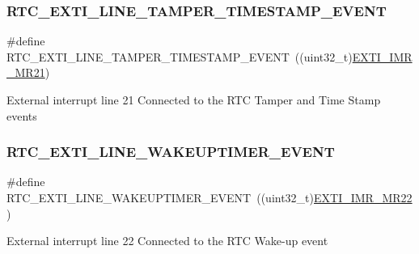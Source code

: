\subsubsection{\texorpdfstring{R\+T\+C\+\_\+\+E\+X\+T\+I\+\_\+\+L\+I\+N\+E\+\_\+\+T\+A\+M\+P\+E\+R\+\_\+\+T\+I\+M\+E\+S\+T\+A\+M\+P\+\_\+\+E\+V\+E\+NT}{RTC\_EXTI\_LINE\_TAMPER\_TIMESTAMP\_EVENT}}
{\footnotesize\ttfamily \#define R\+T\+C\+\_\+\+E\+X\+T\+I\+\_\+\+L\+I\+N\+E\+\_\+\+T\+A\+M\+P\+E\+R\+\_\+\+T\+I\+M\+E\+S\+T\+A\+M\+P\+\_\+\+E\+V\+E\+NT~((uint32\+\_\+t)\hyperlink{group___peripheral___registers___bits___definition_ga3cc7e64c45d273ca7396ac1e0ce38c36}{E\+X\+T\+I\+\_\+\+I\+M\+R\+\_\+\+M\+R21})}

External interrupt line 21 Connected to the R\+TC Tamper and Time Stamp events \mbox{\label{group___r_t_c_ex___private___constants_ga1a1a58e244663850786c387bfa5474f2}} 
\subsubsection{\texorpdfstring{R\+T\+C\+\_\+\+E\+X\+T\+I\+\_\+\+L\+I\+N\+E\+\_\+\+W\+A\+K\+E\+U\+P\+T\+I\+M\+E\+R\+\_\+\+E\+V\+E\+NT}{RTC\_EXTI\_LINE\_WAKEUPTIMER\_EVENT}}
{\footnotesize\ttfamily \#define R\+T\+C\+\_\+\+E\+X\+T\+I\+\_\+\+L\+I\+N\+E\+\_\+\+W\+A\+K\+E\+U\+P\+T\+I\+M\+E\+R\+\_\+\+E\+V\+E\+NT~((uint32\+\_\+t)\hyperlink{group___peripheral___registers___bits___definition_ga2aec84941d816be18a1607b6ee25acb1}{E\+X\+T\+I\+\_\+\+I\+M\+R\+\_\+\+M\+R22})}

External interrupt line 22 Connected to the R\+TC Wake-\/up event 